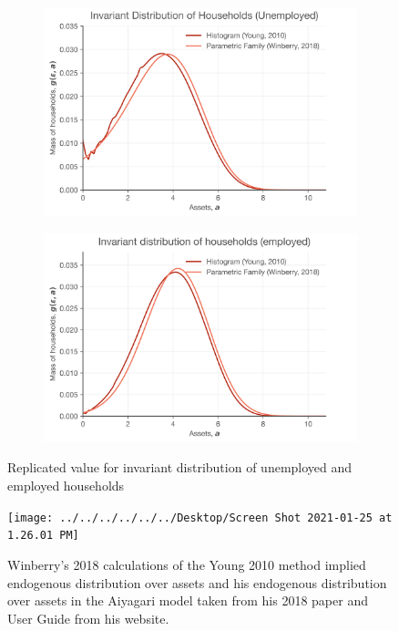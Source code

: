 \documentclass[11pt]{article}
\begin{document}
\begin{figure}[htp]
\begin{subfigure}{.5\textwidth}
\centering
\includegraphics[scale=.45]{Figures/ivar_dist_unemployed.png}
\end{subfigure}
\begin{subfigure}{.5\textwidth}
\centering
\includegraphics[scale=.45]{Figures/ivar_dist_employed.png}
\end{subfigure}
\caption{Replicated value for invariant distribution of unemployed and employed households}
\label{dist_rep}
 \vspace*{\floatsep}
\centering
\texttt{[image: ../../../../../../Desktop/Screen Shot 2021-01-25 at 1.26.01 PM]}
\caption{Winberry's 2018 calculations of the Young 2010 method implied endogenous distribution over assets and his endogenous distribution over assets in the Aiyagari model taken from his 2018 paper and User Guide from his website.}
\label{dist_orig}
\end{figure}	
\end{document}
